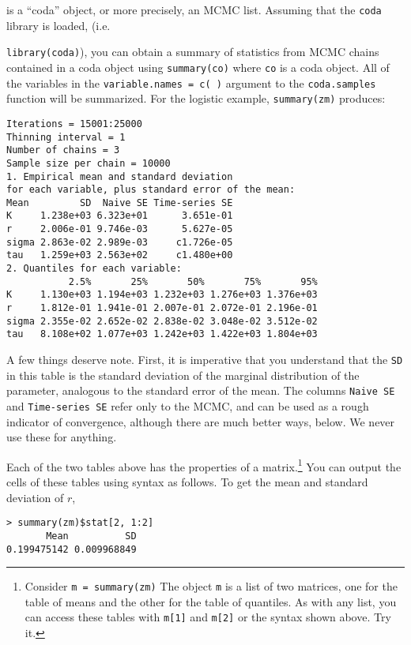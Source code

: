 \documentclass[12pt,english]{article}
\begin{document}
\noindent is a \enquote{coda} object, or more precisely, an MCMC list. Assuming that the \texttt{coda} library is loaded, (i.e.\ {\texttt{library(coda)}), you can obtain a summary of statistics from MCMC chains contained in a coda object using \texttt{summary(co)} where \texttt{co} is a coda object. All of the variables in the \texttt{variable.names = c( )} argument to the \texttt{coda.samples} function will be summarized. For the logistic example, \texttt{summary(zm)} produces:

\begin{Verbatim}[fontsize=\small]
Iterations = 15001:25000
Thinning interval = 1
Number of chains = 3
Sample size per chain = 10000
1. Empirical mean and standard deviation
for each variable, plus standard error of the mean:
Mean         SD  Naive SE Time-series SE
K     1.238e+03 6.323e+01      3.651e-01
r     2.006e-01 9.746e-03      5.627e-05
sigma 2.863e-02 2.989e-03     c1.726e-05
tau   1.259e+03 2.563e+02     c1.480e+00
2. Quantiles for each variable:
           2.5%       25%       50%       75%       95%
K     1.130e+03 1.194e+03 1.232e+03 1.276e+03 1.376e+03
r     1.812e-01 1.941e-01 2.007e-01 2.072e-01 2.196e-01
sigma 2.355e-02 2.652e-02 2.838e-02 3.048e-02 3.512e-02
tau   8.108e+02 1.077e+03 1.242e+03 1.422e+03 1.804e+03
\end{Verbatim}

\noindent A few things deserve note. First, it is imperative that you understand that the \texttt{SD} in this table is the standard deviation of the marginal distribution of the parameter, analogous to the standard error of the mean. The columns \texttt{Naive SE} and \texttt{Time-series SE} refer only to the MCMC, and can be used as a rough indicator of convergence, although there are much better ways, below. We never use these for anything.

Each of the two tables above has the properties of a matrix.\footnote{Consider \texttt{m = summary(zm)} The object \texttt{m} is a list of two matrices, one for the table of means and the other for the table of quantiles. As with any list, you can access these tables with \texttt{m[1]} and \texttt{m[2]} or the syntax shown above. Try it.} You can output the cells of these tables using syntax as follows. To get the mean and standard deviation of $r$, 

\begin{Verbatim}
> summary(zm)$stat[2, 1:2]
       Mean          SD
0.199475142 0.009968849
\end{Verbatim}

}
\end{document}
